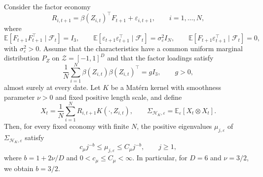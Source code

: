 \begin{proposition}
Consider the factor economy
\[
R_{i,t+1}=\beta(Z_{i,t})^\top F_{t+1}+\varepsilon_{i,t+1},
\qquad i=1,\ldots,N,
\]
where
\[
\mathbb E[F_{t+1}F_{t+1}^\top\mid\mathcal F_t]=I_3,
\qquad
\mathbb E[\varepsilon_{t+1}\varepsilon_{t+1}^\top\mid\mathcal F_t]
=\sigma_\varepsilon^2I_N,
\qquad
\mathbb E[F_{t+1}\varepsilon_{t+1}^\top\mid\mathcal F_t]=0,
\]
with $\sigma_\varepsilon^2>0$. Assume that the characteristics have a common uniform marginal distribution $P_Z$ on $\mathcal Z=[-1,1]^D$ and that the factor loadings satisfy
\[
\frac1N\sum_{i=1}^N
\beta(Z_{i,t})\beta(Z_{i,t})^\top=gI_3,
\qquad g>0,
\]
almost surely at every date. Let $K$ be a Matérn kernel with smoothness parameter $\nu>0$ and fixed positive length scale, and define
\[
X_t=\frac1N\sum_{i=1}^N R_{i,t+1}K(\cdot,Z_{i,t}),
\qquad
\Sigma_{\mathcal H_K,\varepsilon}
=\mathbb E_\varepsilon[X_t\otimes X_t].
\]
Then, for every fixed economy with finite $N$, the positive eigenvalues $\mu_{j,\varepsilon}$ of $\Sigma_{\mathcal H_K,\varepsilon}$ satisfy
\[
c_\mu j^{-b}\leq\mu_{j,\varepsilon}\leq C_\mu j^{-b},
\qquad j\geq1,
\]
where $b=1+2\nu/D$ and $0<c_\mu\leq C_\mu<\infty$. In particular, for $D=6$ and $\nu=3/2$, we obtain $b=3/2$.
\end{proposition}

